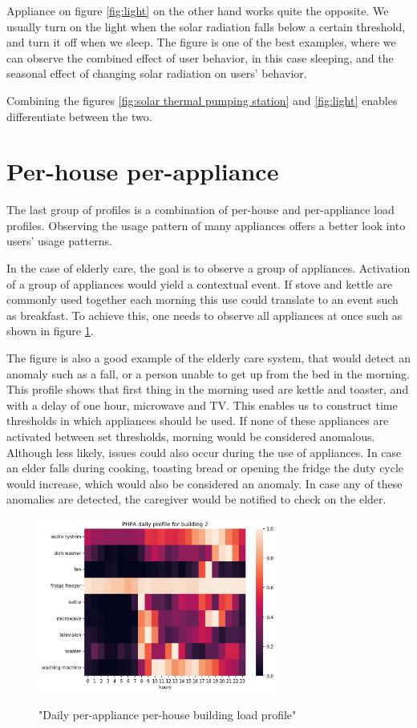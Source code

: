 Appliance on figure \ref{fig:light} on the other hand works quite the opposite.
We usually turn on the light when the solar radiation falls below a certain threshold, and turn it off when we sleep.
The figure is one of the best examples, where we can observe the combined effect of user behavior, in this case sleeping, and the seasonal effect of changing solar radiation on users' behavior. 

Combining the figures \ref{fig:solar thermal pumping station} and \ref{fig:light} enables differentiate between the two. 

\section{Per-house per-appliance}

The last group of profiles is a combination of per-house and per-appliance load profiles.
Observing the usage pattern of many appliances offers a better look into users' usage patterns.

In the case of elderly care, the goal is to observe a group of appliances.
Activation of a group of appliances would yield a contextual event.
If stove and kettle are commonly used together each morning this use could translate to an event such as breakfast. 
To achieve this, one needs to observe all appliances at once such as shown in figure \ref{fig:PHPA}.

The figure is also a good example of the elderly care system, that would detect an anomaly such as a fall, or a person unable to get up from the bed in the morning.
This profile shows that first thing in the morning used are kettle and toaster, and with a delay of one hour, microwave and TV. 
This enables us to construct time thresholds in which appliances should be used.
If none of these appliances are activated between set thresholds, morning would be considered anomalous.
Although less likely, issues could also occur during the use of appliances. 
In case an elder falls during cooking, toasting bread or opening the fridge the duty cycle would increase, which would also be considered an anomaly.
In case any of these anomalies are detected, the caregiver would be notified to check on the elder. 

\begin{figure}[H]
	\centering
	\caption{"Daily per-appliance per-house building load profile"}
	\includegraphics[width=0.7\textwidth]{../Figures/LPS/PHPA.png}
	\label{fig:PHPA}
\end{figure}

